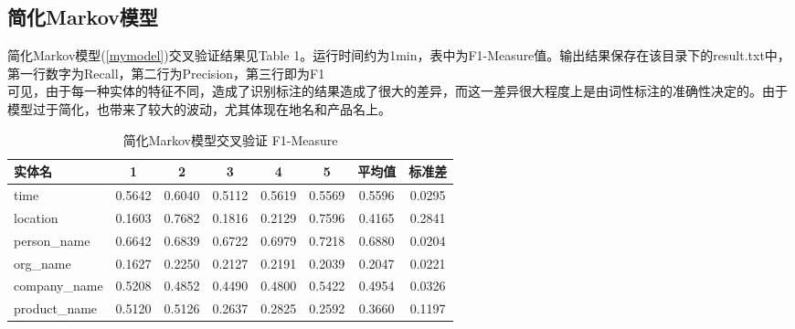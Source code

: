 \documentclass[11pt]{article}
\begin{document}
\subsection{简化Markov模型}
\hspace{1.6em} 简化Markov模型(\ref{mymodel})交叉验证结果见Table 1。运行时间约为1min，表中为F1-Measure值。输出结果保存在该目录下的result.txt中，第一行数字为Recall，第二行为Precision，第三行即为F1\\
\indent 可见，由于每一种实体的特征不同，造成了识别标注的结果造成了很大的差异，而这一差异很大程度上是由词性标注的准确性决定的。由于模型过于简化，也带来了较大的波动，尤其体现在地名和产品名上。
\begin{table}[htbp]
\setlength{\belowcaptionskip}{10pt}
\caption{简化Markov模型交叉验证 F1-Measure}
\centering
\begin{tabular}{|l|c|c|c|c|c|c|c|}
\hline
  实体名 & 1 & 2 & 3 & 4 & 5 & 平均值 & 标准差\\ \hline
  time & 0.5642 & 0.6040 & 0.5112 & 0.5619 & 0.5569& 0.5596& 0.0295 \\ \hline
  location & 0.1603 & 0.7682 & 0.1816 & 0.2129 & 0.7596& 0.4165& 0.2841\\ \hline
  person\_name & 0.6642 & 0.6839 & 0.6722 & 0.6979 & 0.7218& 0.6880& 0.0204 \\ \hline
  org\_name & 0.1627 & 0.2250 & 0.2127 & 0.2191 & 0.2039& 0.2047& 0.0221 \\ \hline
  company\_name & 0.5208 & 0.4852 & 0.4490 & 0.4800 & 0.5422& 0.4954& 0.0326 \\ \hline
  product\_name & 0.5120 & 0.5126 & 0.2637 & 0.2825 & 0.2592& 0.3660& 0.1197 \\
  \hline
\end{tabular}
\end{table}
\end{document}
